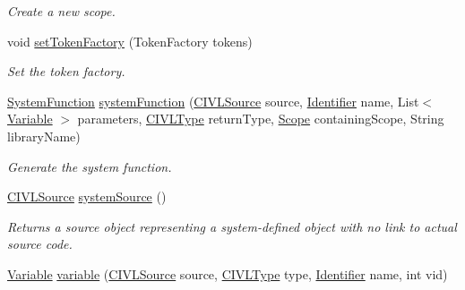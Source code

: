 \begin{DoxyCompactItemize}
\begin{DoxyCompactList}\small\item\em Create a new scope. \end{DoxyCompactList}\item 
void \hyperlink{classedu_1_1udel_1_1cis_1_1vsl_1_1civl_1_1model_1_1common_1_1CommonModelFactory_ad99d53d0d820b35448332ec178cec51a}{set\+Token\+Factory} (Token\+Factory tokens)
\begin{DoxyCompactList}\small\item\em Set the token factory. \end{DoxyCompactList}\item 
\hyperlink{interfaceedu_1_1udel_1_1cis_1_1vsl_1_1civl_1_1model_1_1IF_1_1SystemFunction}{System\+Function} \hyperlink{classedu_1_1udel_1_1cis_1_1vsl_1_1civl_1_1model_1_1common_1_1CommonModelFactory_af1215c80a4c75ea10841bdc4d3a71c13}{system\+Function} (\hyperlink{interfaceedu_1_1udel_1_1cis_1_1vsl_1_1civl_1_1model_1_1IF_1_1CIVLSource}{C\+I\+V\+L\+Source} source, \hyperlink{interfaceedu_1_1udel_1_1cis_1_1vsl_1_1civl_1_1model_1_1IF_1_1Identifier}{Identifier} name, List$<$ \hyperlink{interfaceedu_1_1udel_1_1cis_1_1vsl_1_1civl_1_1model_1_1IF_1_1variable_1_1Variable}{Variable} $>$ parameters, \hyperlink{interfaceedu_1_1udel_1_1cis_1_1vsl_1_1civl_1_1model_1_1IF_1_1type_1_1CIVLType}{C\+I\+V\+L\+Type} return\+Type, \hyperlink{interfaceedu_1_1udel_1_1cis_1_1vsl_1_1civl_1_1model_1_1IF_1_1Scope}{Scope} containing\+Scope, String library\+Name)
\begin{DoxyCompactList}\small\item\em Generate the system function. \end{DoxyCompactList}\item 
\hyperlink{interfaceedu_1_1udel_1_1cis_1_1vsl_1_1civl_1_1model_1_1IF_1_1CIVLSource}{C\+I\+V\+L\+Source} \hyperlink{classedu_1_1udel_1_1cis_1_1vsl_1_1civl_1_1model_1_1common_1_1CommonModelFactory_a4fb5cb6f441f68eca632541c433929cc}{system\+Source} ()
\begin{DoxyCompactList}\small\item\em Returns a source object representing a system-\/defined object with no link to actual source code. \end{DoxyCompactList}\item 
\hyperlink{interfaceedu_1_1udel_1_1cis_1_1vsl_1_1civl_1_1model_1_1IF_1_1variable_1_1Variable}{Variable} \hyperlink{classedu_1_1udel_1_1cis_1_1vsl_1_1civl_1_1model_1_1common_1_1CommonModelFactory_afda3078a15e9df171117357e42739ea3}{variable} (\hyperlink{interfaceedu_1_1udel_1_1cis_1_1vsl_1_1civl_1_1model_1_1IF_1_1CIVLSource}{C\+I\+V\+L\+Source} source, \hyperlink{interfaceedu_1_1udel_1_1cis_1_1vsl_1_1civl_1_1model_1_1IF_1_1type_1_1CIVLType}{C\+I\+V\+L\+Type} type, \hyperlink{interfaceedu_1_1udel_1_1cis_1_1vsl_1_1civl_1_1model_1_1IF_1_1Identifier}{Identifier} name, int vid)

\end{DoxyCompactItemize}
